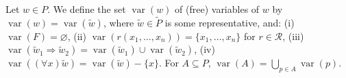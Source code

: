 Let $w \in P$. We define the set $\operatorname{var}(w)$ of (free) variables of $w$ by $\operatorname{var}(w) = \operatorname{var}(\tilde{w})$, where $\tilde{w} \in \tilde{P}$ is some representative, and:
(i) $\operatorname{var}(F) = \varnothing$,
(ii) $\operatorname{var}(r(x_1, \ldots, x_n)) = \{x_1, \ldots, x_n\}$ for $r \in \mathcal{R}$,
(iii) $\operatorname{var}(\tilde{w}_1 \Rightarrow \tilde{w}_2) = \operatorname{var}(\tilde{w}_1) \cup \operatorname{var}(\tilde{w}_2)$,
(iv) $\operatorname{var}((\forall x)\tilde{w}) = \operatorname{var}(\tilde{w}) - \{x\}$.
For $A \subseteq P$, $\operatorname{var}(A) = \bigcup_{p \in A} \operatorname{var}(p)$.
